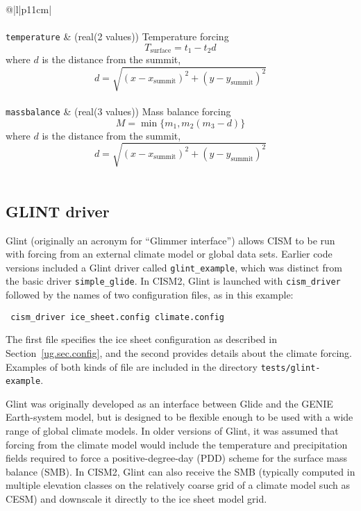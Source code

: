 \begin{center}
\begin{supertabular*}{\textwidth}{@{\extracolsep{\fill}}|l|p{11cm}|}
    \hline
    \\
    \hline
    \\
    \hline
    \texttt{temperature} & (real(2 values)) Temperature forcing $$T_{\mbox{surface}}=t_1-t_2d$$ where $d$ is the distance from the summit, $$d=\sqrt{(x-x_{\mbox{summit}})^2+(y-y_{\mbox{summit}})^2}$$\\
    \texttt{massbalance} & (real(3 values)) Mass balance forcing $$M=\min\{m_1,m_2(m_3-d)\}$$ where $d$ is the distance from the summit, $$d=\sqrt{(x-x_{\mbox{summit}})^2+(y-y_{\mbox{summit}})^2}$$\\
    \hline
  \end{supertabular*}
\end{center}

%


\subsection{GLINT driver}

%
Glint (originally an acronym for ``Glimmer interface'') allows CISM
to be run with forcing from an external climate model or global data sets.
Earlier code versions included a Glint driver called \texttt{glint\_example},
which was distinct from the basic driver \texttt{simple\_glide}.
In CISM2, Glint is launched with \texttt{cism\_driver} followed by the
names of two configuration files, as in this example:
\begin{verbatim}
 cism_driver ice_sheet.config climate.config
\end{verbatim}
The first file specifies the ice sheet configuration as described in Section~\ref{ug.sec.config},
and the second provides details about the climate forcing.
Examples of both kinds of file are included in the directory \texttt{tests/glint-example}.

Glint was originally developed as an interface between Glide and the GENIE Earth-system
model, but is designed to be flexible enough to be used with a wide range of
global climate models. In older versions of Glint, it was assumed that forcing from the climate
model would include the temperature and precipitation fields required to
force a positive-degree-day (PDD) scheme for the surface mass balance (SMB).
In CISM2, Glint can also receive the SMB (typically computed in multiple
elevation classes on the relatively coarse grid of a climate model such as CESM)
and downscale it directly to the ice sheet model grid.

